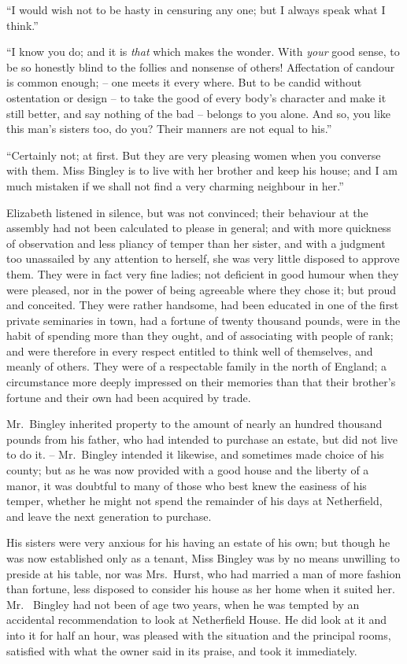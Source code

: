 “I would wish not to be hasty in censuring any one;
but I always speak what I think.”

“I know you do; and it is \textit{that} which makes the wonder.
With \textit{your} good sense, to be so honestly blind to the follies
and nonsense of others! Affectation of candour is common
enough; -- one meets it every where. But to be candid
without ostentation or design -- to take the good of every
body’s character and make it still better, and say nothing
of the bad -- belongs to you alone. And so, you like this
man’s sisters too, do you? Their manners are not equal
to his.”

“Certainly not; at first. But they are very pleasing
women when you converse with them. Miss Bingley
is to live with her brother and keep his house; and I am
much mistaken if we shall not find a very charming
neighbour in her.”

Elizabeth listened in silence, but was not convinced;
their behaviour at the assembly had not been calculated
to please in general; and with more quickness of observation
and less pliancy of temper than her sister, and
with a judgment too unassailed by any attention to herself,
she was very little disposed to approve them. They were
in fact very fine ladies; not deficient in good humour
when they were pleased, nor in the power of being agreeable
where they chose it; but proud and conceited. They
were rather handsome, had been educated in one of the
first private seminaries in town, had a fortune of twenty
thousand pounds, were in the habit of spending more than
they ought, and of associating with people of rank; and
were therefore in every respect entitled to think well of
themselves, and meanly of others. They were of a respectable
family in the north of England; a circumstance more
deeply impressed on their memories than that their
brother’s fortune and their own had been acquired by
trade.

Mr.\ Bingley inherited property to the amount of nearly
an hundred thousand pounds from his father, who had
intended to purchase an estate, but did not live to do it. --
Mr.\ Bingley intended it likewise, and sometimes made
choice of his county; but as he was now provided with
a good house and the liberty of a manor, it was doubtful
to many of those who best knew the easiness of his
temper, whether he might not spend the remainder of his
days at Netherfield, and leave the next generation to
purchase.

His sisters were very anxious for his having an estate
of his own; but though he was now established only as
a tenant, Miss Bingley was by no means unwilling to
preside at his table, nor was Mrs.\ Hurst, who had married
a man of more fashion than fortune, less disposed to
consider his house as her home when it suited her. Mr.\ %
Bingley had not been of age two years, when he was
tempted by an accidental recommendation to look at
Netherfield House. He did look at it and into it for half
an hour, was pleased with the situation and the principal
rooms, satisfied with what the owner said in its praise,
and took it immediately.

